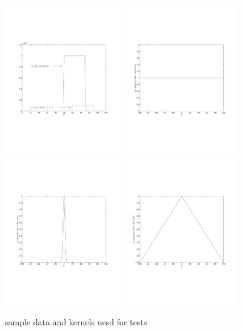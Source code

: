 \documentclass{article}
\begin{document}
\begin{figure}
\begin{center}
\includegraphics[width=5cm]{data}
\includegraphics[width=5cm]{kernel1}
\includegraphics[width=5cm]{kernel2}
\includegraphics[width=5cm]{kernel3}
\end{center}
\caption{sample data and kernels uesd for tests}%
\label{test}%
\end{figure}
\end{document}
